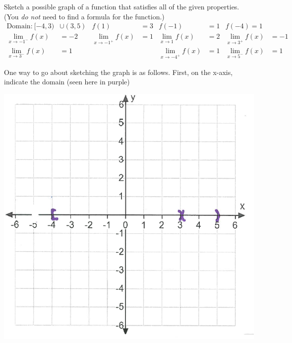 \documentclass[nooutcomes,handout]{ximera}
\begin{document}
					

\begin{problem}
Sketch a possible graph of a function that satisfies all of the given properties.
  (You \emph{do not} need to find a formula for the function.)
	\begin{align*}
	 \text{Domain:}\ [-4,3)&\cup(3,5)&  f(1) &= 3 & f(-1) &= 1& f(-4)=1\\
	 \lim_{x \to -1^-} f(x) &= -2 & \lim_{x \to -1^+} f(x) &= 1 &   \lim_{x \to 1} f(x) &= 2&  \lim_{x \to 3^+} f(x) &=-1\\
	\lim_{x \to 3^-} f(x)&=1& & &  \lim_{x \to -4^+} f(x) &= 1 &  \lim_{x \to 5^-} f(x) &= 1 &
	\end{align*}
	\begin{freeResponse} 
	One way to go about sketching the graph is as follows.  First, on the x-axis, indicate the domain (seen here in purple)
	    \begin{image}
	\includegraphics[scale=.5]{"Sketching stage 1"}
    \end{image}


\end{freeResponse}
\end{problem}
\end{document}

